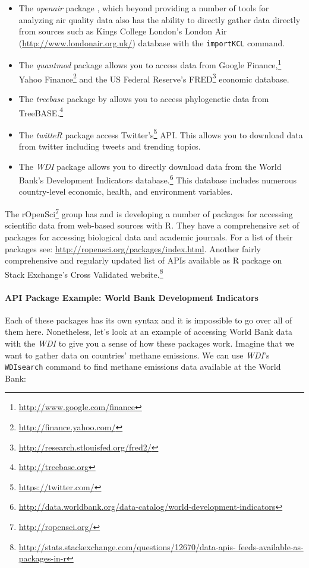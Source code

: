 \begin{itemize}
	\item The \emph{openair} package \citep{R-openair}, which beyond providing a number of tools for analyzing air quality data also has the ability to directly gather data directly from sources such as Kings College London's London Air (\url{http://www.londonair.org.uk/}) database with the \texttt{importKCL} command.
	\item The \emph{quantmod} package \citep{R-quantmod} allows you to access data from Google Finance,\footnote{\url{http://www.google.com/finance}} Yahoo Finance\footnote{\url{http://finance.yahoo.com/}} and the US Federal Reserve's FRED\footnote{\url{http://research.stlouisfed.org/fred2/}} economic database.
	\item The \emph{treebase} package by \cite{Boettiger2012} allows you to access phylogenetic data from TreeBASE.\footnote{\url{http://treebase.org}}
	\item The \emph{twitteR} package \citep{R-twitteR} access Twitter's\footnote{\url{https://twitter.com/}} API. This allows you to download data from twitter including tweets and trending topics.
	\item The \emph{WDI} package \citep{R-WDI} allows you to directly download data from the World Bank's Development Indicators database.\footnote{\url{http://data.worldbank.org/data-catalog/world-development-indicators}} This database includes numerous country-level economic, health, and environment variables. 
\end{itemize}

The rOpenSci\footnote{\url{http://ropensci.org/}} group has and is developing a number of packages for accessing scientific data from web-based sources with R. They have a comprehensive set of packages for accessing biological data and academic journals. For a list of their packages see: \url{http://ropensci.org/packages/index.html}. Another fairly comprehensive and regularly updated list of APIs available as R package on Stack Exchange's Cross Validated website.\footnote{{\small{\url{http://stats.stackexchange.com/questions/12670/data-apis- feeds-available-as-packages-in-r}}}}

\paragraph{API Package Example: World Bank Development Indicators}

Each of these packages has its own syntax and it is impossible to go over all of them here. Nonetheless, let's look at an example of accessing World Bank data with the \emph{WDI} to give you a sense of how these packages work. Imagine that we want to gather data on countries' methane emissions. We can use \emph{WDI}'s \texttt{WDIsearch} command to find methane emissions data available at the World Bank:

